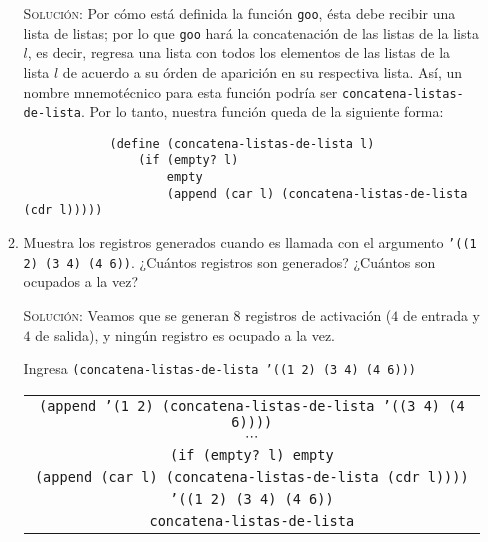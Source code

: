 \documentclass[letterpaper,11pt]{article}
\begin{document}
\begin{enumerate}
\begin{enumerate}
        \textsc{Solución:} Por cómo está definida la función \texttt{goo}, 
        ésta debe recibir una lista de listas; por lo que \texttt{goo} hará 
        la concatenación de las listas de la lista $l$, es decir, regresa una 
        lista con todos los elementos de las listas de la lista $l$ de acuerdo 
        a su órden de aparición en su respectiva lista. Así, un nombre 
        mnemotécnico para esta función podría ser 
        \texttt{concatena-listas-de-lista}. Por lo tanto, nuestra función 
        queda de la siguiente forma:
        \begin{verbatim}
            (define (concatena-listas-de-lista l)
                (if (empty? l)
                    empty
                    (append (car l) (concatena-listas-de-lista (cdr l)))))
        \end{verbatim}

        \newpage
        \item Muestra los registros generados cuando es llamada con el argumento
        \texttt{'((1 2) (3 4) (4 6))}. ¿Cuántos registros son generados? ¿Cuántos 
        son ocupados a la vez?

        \textsc{Solución:} Veamos que se generan $8$ registros de activación
        ($4$ de entrada y $4$ de salida), y ningún registro es ocupado a la vez.

        Ingresa \texttt{(concatena-listas-de-lista '((1 2) (3 4) (4 6)))}
        \begin{center}
            \begin{tabular}{|c|}
                \hline
                \texttt{(append '(1 2) 
                (concatena-listas-de-lista '((3 4) (4 6))))}  \\
                $\cdots$ \\
                \texttt{(if (empty? l) empty} \\
                \texttt{(append (car l) (concatena-listas-de-lista (cdr l))))} \\
                \texttt{'((1 2) (3 4) (4 6))} \\
                \texttt{concatena-listas-de-lista} \\
                \hline
            \end{tabular}
        \end{center}


\end{enumerate}
\end{enumerate}
\end{document}

